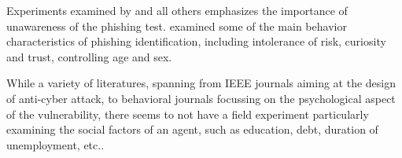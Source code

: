 Experiments examined by 
\citet*{Kumaraguru2009, IEEE_phish}
and all others emphasizes the importance of unawareness of the phishing test. 
\cite*{Chen2018} examined some of the main behavior characteristics of phishing identification, 
including intolerance of risk, curiosity and trust, controlling age and sex. 

While a variety of literatures, spanning from IEEE journals aiming at the design of anti-cyber attack,
 to behavioral journals focussing on the psychological aspect of the vulnerability, 
there seems to not have a field experiment particularly examining the social factors of an agent, 
such as education, debt, duration of unemployment, etc.. 

